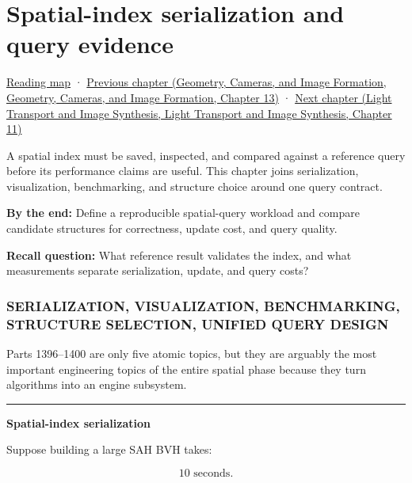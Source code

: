 \hypertarget{06-engine-ii-ch031}{}
\chapter{Spatial-index serialization and query evidence}\label{stagechapter:06-engine-ii-ch031}\label{06-engine-ii-ch031-spatial-index-serialization-and-query-evidence}

\hyperref[volume-reading-map]{Reading map} · \href{../03-Geometry-Cameras-and-Image-Formation/main.pdf\#nameddest=06-engine-ii-ch030-depth-projection-and-shadow-map-precision}{Previous chapter (Geometry, Cameras, and Image Formation, Geometry, Cameras, and Image Formation, Chapter 13)} · \href{../04-Light-Transport-and-Image-Synthesis/main.pdf\#nameddest=06-engine-ii-ch032-terrain-materials-and-image-composition}{Next chapter (Light Transport and Image Synthesis, Light Transport and Image Synthesis, Chapter 11)}

A spatial index must be saved, inspected, and compared against a reference query before its performance claims are useful. This chapter joins serialization, visualization, benchmarking, and structure choice around one query contract.

\textbf{By the end:} Define a reproducible spatial-query workload and compare candidate structures for correctness, update cost, and query quality.

\textbf{Recall question:} What reference result validates the index, and what measurements separate serialization, update, and query costs?

\subsection{SERIALIZATION, VISUALIZATION, BENCHMARKING, STRUCTURE SELECTION, UNIFIED QUERY DESIGN}\label{06-engine-ii-ch031-serialization-visualization-benchmarking-structure-selection-unified-query-design}

Parts 1396--1400 are only five atomic topics, but they are arguably the most important engineering topics of the entire spatial phase because they turn algorithms into an engine subsystem.

\begin{center}\rule{0.5\linewidth}{0.5pt}\end{center}

\textbf{Spatial-index serialization}

Suppose building a large SAH BVH takes:

\[
10\text{ seconds}.
\]

